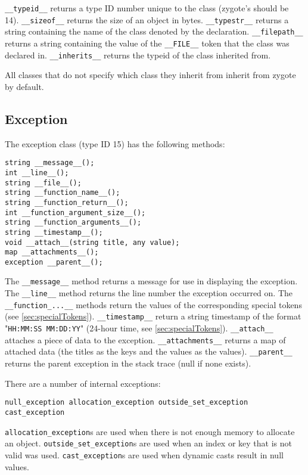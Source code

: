 \documentclass[10pt,a4paper]{article}
\begin{document}
\verb|__typeid__| returns a type ID number unique to the class (zygote's should be 14). \verb|__sizeof__| returns the size of an object in bytes. \verb|__typestr__| returns a string containing the name of the class denoted by the declaration. \verb|__filepath__| returns a string containing the value of the \verb|__FILE__| token that the class was declared in. \verb|__inherits__| returns the typeid of the class inherited from.

All classes that do not specify which class they inherit from inherit from zygote by default.

\subsection{Exception}
\label{sec:exceptions}
The exception class (type ID 15) has the following methods:
\begin{verbatim}
string __message__();
int __line__();
string __file__();
string __function_name__();
string __function_return__();
int __function_argument_size__();
string __function_arguments__();
string __timestamp__();
void __attach__(string title, any value);
map __attachments__();
exception __parent__();
\end{verbatim}

The \verb|__message__| method returns a message for use in displaying the exception. The \verb|__line__| method returns the line number the exception occurred on. The \verb|__function_...__| methods return the values of the corresponding special tokens (see \ref{sec:specialTokens}). \verb|__timestamp__| return a string timestamp of the format "\verb|HH:MM:SS MM:DD:YY|" (24-hour time, see \ref{sec:specialTokens}). \verb|__attach__| attaches a piece of data to the exception. \verb|__attachments__| returns a map of attached data (the titles as the keys and the values as the values). \verb|__parent__| returns the parent exception in the stack trace (null if none exists).

There are a number of internal exceptions:
\begin{verbatim}
null_exception allocation_exception outside_set_exception
cast_exception
\end{verbatim}

\verb|allocation_exception|s are used when there is not enough memory to allocate an object. \verb|outside_set_exception|s are used when an index or key that is not valid was used. \verb|cast_exception|s are used when dynamic casts result in null values.
\end{document}
